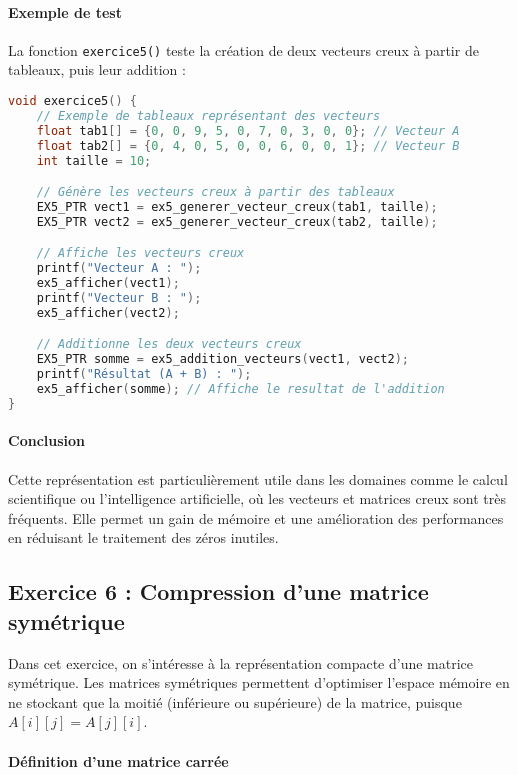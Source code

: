 \documentclass[a4paper,12pt]{article}
\begin{document}
\paragraph{Exemple de test}

La fonction \texttt{exercice5()} teste la création de deux vecteurs creux à partir de tableaux, puis leur addition :

\begin{lstlisting}[language=C, caption={Fonction de test}]
void exercice5() {
    // Exemple de tableaux représentant des vecteurs
    float tab1[] = {0, 0, 9, 5, 0, 7, 0, 3, 0, 0}; // Vecteur A
    float tab2[] = {0, 4, 0, 5, 0, 0, 6, 0, 0, 1}; // Vecteur B
    int taille = 10;

    // Génère les vecteurs creux à partir des tableaux
    EX5_PTR vect1 = ex5_generer_vecteur_creux(tab1, taille);
    EX5_PTR vect2 = ex5_generer_vecteur_creux(tab2, taille);

    // Affiche les vecteurs creux
    printf("Vecteur A : ");
    ex5_afficher(vect1);
    printf("Vecteur B : ");
    ex5_afficher(vect2);

    // Additionne les deux vecteurs creux
    EX5_PTR somme = ex5_addition_vecteurs(vect1, vect2);
    printf("Résultat (A + B) : ");
    ex5_afficher(somme); // Affiche le resultat de l'addition
}
\end{lstlisting}

\paragraph{Conclusion}

Cette représentation est particulièrement utile dans les domaines comme le calcul scientifique ou l’intelligence artificielle, où les vecteurs et matrices creux sont très fréquents. Elle permet un gain de mémoire et une amélioration des performances en réduisant le traitement des zéros inutiles.


\subsection{Exercice 6 : Compression d’une matrice symétrique}

Dans cet exercice, on s'intéresse à la représentation compacte d’une matrice symétrique. Les matrices symétriques permettent d’optimiser l’espace mémoire en ne stockant que la moitié (inférieure ou supérieure) de la matrice, puisque $A[i][j] = A[j][i]$.

\paragraph{Définition d’une matrice carrée}
\end{document}
